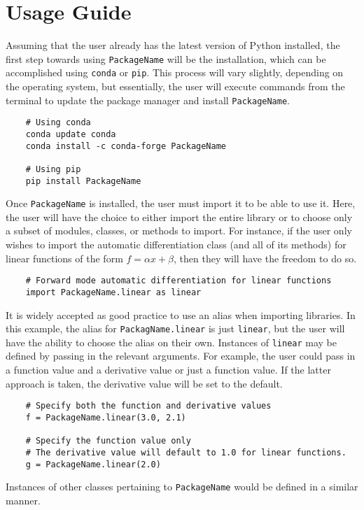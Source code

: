     \section*{Usage Guide}
    Assuming that the user already has the latest version of Python installed, 
    the first step towards using \texttt{PackageName} will be the installation, 
    which can be accomplished using \texttt{conda} or \texttt{pip}. This process
    will vary slightly, depending on the operating system, but essentially, the 
    user will execute commands from the terminal to update the package manager 
    and install \texttt{PackageName}. 
    \begin{verbatim}
    # Using conda
    conda update conda
    conda install -c conda-forge PackageName
    
    # Using pip
    pip install PackageName
    \end{verbatim}
    Once \texttt{PackageName} is installed, the user must import it to be able 
    to use it. Here, the user will have the choice to either import the entire 
    library or to choose only a subset of modules, classes, or methods to import.
    For instance, if the user only wishes to import the automatic 
    differentiation class (and all of its methods) for linear functions of the 
    form $f = \alpha x + \beta$, then they will have the freedom to do so. 
    \begin{verbatim}
    # Forward mode automatic differentiation for linear functions
    import PackageName.linear as linear
    \end{verbatim}
    It is widely accepted as good practice to use an alias when importing 
    libraries. In this example, the alias for \texttt{PackagName.linear} is just
    \texttt{linear}, but the user will have the ability to choose the alias on 
    their own. Instances of \texttt{linear} may be defined by passing in the 
    relevant arguments. For example, the user could pass in a function value and
    a derivative value or just a function value. If the latter approach is 
    taken, the derivative value will be set to the default. 
    \begin{verbatim}  
    # Specify both the function and derivative values
    f = PackageName.linear(3.0, 2.1)
    
    # Specify the function value only
    # The derivative value will default to 1.0 for linear functions.
    g = PackageName.linear(2.0)
    \end{verbatim}
    Instances of other classes pertaining to \texttt{PackageName} would be 
    defined in a similar manner. 
    
